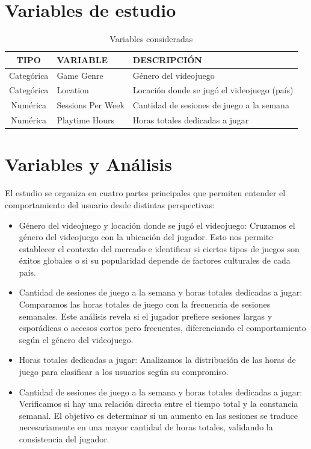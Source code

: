 \documentclass[oneside,11pt]{Latex/Classes/PhDthesisPSnPDF}
\begin{document}
\section {Variables de estudio}

\begin{table}[ht]
\centering
\caption{Variables consideradas} 
\resizebox{10cm}{!} {
\begin{tabular}{cll}
  \hline
  \textbf{TIPO} & \textbf{VARIABLE} & \textbf{DESCRIPCIÓN} \\ 
  \hline
  Categórica & Game Genre & Género del videojuego \\ 
  Categórica & Location & Locación donde se jugó el videojuego (país) \\ 
  Numérica & Sessions Per Week & Cantidad de sesiones de juego a la semana \\
  Numérica & Playtime Hours & Horas totales dedicadas a jugar \\ 
   \hline
\end{tabular}
}
\end{table}

\section{Variables y Análisis}

El estudio se organiza en cuatro partes principales que permiten
entender el comportamiento del usuario desde distintas perspectivas:

\begin{itemize}
  \item{Género del videojuego y locación donde se jugó el videojuego: Cruzamos el género del videojuego con la ubicación del jugador. Esto nos permite establecer el contexto del mercado e identificar si ciertos tipos de juegos son éxitos globales o si su popularidad depende de factores culturales de cada país.}
  \item{Cantidad de sesiones de juego a la semana y horas totales dedicadas a jugar: Comparamos las horas totales de juego con la frecuencia de sesiones semanales. Este análisis revela si el jugador prefiere sesiones largas y esporádicas o accesos cortos pero frecuentes, diferenciando el comportamiento según el género del videojuego.}
  \item{Horas totales dedicadas a jugar: Analizamos la distribución de las horas de juego para clasificar a los usuarios según su compromiso.}
  \item{Cantidad de sesiones de juego a la semana y horas totales dedicadas a jugar: Verificamos si hay una relación directa entre el tiempo total y la constancia semanal. El objetivo es determinar si un aumento en las sesiones se traduce necesariamente en una mayor cantidad de horas totales, validando la consistencia del jugador.}
\end{itemize}
\end{document}
